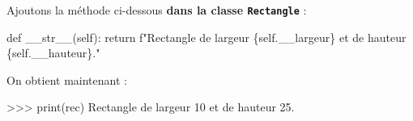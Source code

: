 \documentclass[
  a4paper,
  DIV=11,
  numbers=noendperiod]{scrartcl}
\newenvironment{Shaded}{\begin{snugshade}}{\end{snugshade}}
\newcommand{\BuiltInTok}[1]{\textcolor[rgb]{0.00,0.23,0.31}{#1}}
\newcommand{\ControlFlowTok}[1]{\textcolor[rgb]{0.00,0.23,0.31}{#1}}
\newcommand{\DecValTok}[1]{\textcolor[rgb]{0.68,0.00,0.00}{#1}}
\newcommand{\FloatTok}[1]{\textcolor[rgb]{0.68,0.00,0.00}{#1}}
\newcommand{\FunctionTok}[1]{\textcolor[rgb]{0.28,0.35,0.67}{#1}}
\newcommand{\KeywordTok}[1]{\textcolor[rgb]{0.00,0.23,0.31}{#1}}
\newcommand{\NormalTok}[1]{\textcolor[rgb]{0.00,0.23,0.31}{#1}}
\newcommand{\OperatorTok}[1]{\textcolor[rgb]{0.37,0.37,0.37}{#1}}
\newcommand{\SpecialCharTok}[1]{\textcolor[rgb]{0.37,0.37,0.37}{#1}}
\newcommand{\SpecialStringTok}[1]{\textcolor[rgb]{0.13,0.47,0.30}{#1}}
\newcommand{\VariableTok}[1]{\textcolor[rgb]{0.07,0.07,0.07}{#1}}
\begin{document}
Ajoutons la méthode ci-dessous \textbf{dans la classe
\texttt{Rectangle}} :

\begin{Shaded}
\begin{Highlighting}[]
\KeywordTok{def} \FunctionTok{\_\_str\_\_}\NormalTok{(}\VariableTok{self}\NormalTok{):}
    \ControlFlowTok{return} \SpecialStringTok{f"Rectangle de largeur }\SpecialCharTok{\{}\VariableTok{self}\SpecialCharTok{.}\NormalTok{\_\_largeur}\SpecialCharTok{\}}\SpecialStringTok{ et de hauteur }\SpecialCharTok{\{}\VariableTok{self}\SpecialCharTok{.}\NormalTok{\_\_hauteur}\SpecialCharTok{\}}\SpecialStringTok{."}
\end{Highlighting}
\end{Shaded}

On obtient maintenant :

\begin{Shaded}
\begin{Highlighting}[]
\OperatorTok{\textgreater{}\textgreater{}\textgreater{}} \BuiltInTok{print}\NormalTok{(rec)}
\NormalTok{Rectangle de largeur }\DecValTok{10}\NormalTok{ et de hauteur }\FloatTok{25.}
\end{Highlighting}
\end{Shaded}
\end{document}
